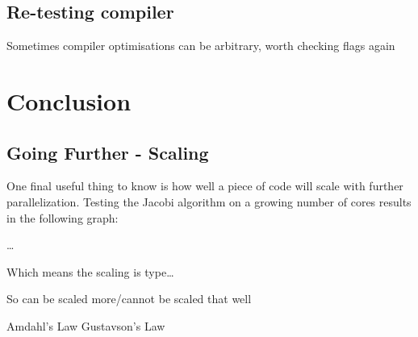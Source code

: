 \documentclass{article}
\begin{document}
\subsection{Re-testing compiler}
Sometimes compiler optimisations can be arbitrary, worth checking flags again

\section{Conclusion}
\subsection{Going Further - Scaling}
One final useful thing to know is how well a piece of code will scale
with further parallelization. Testing the Jacobi algorithm on a growing number of
cores results in the following graph:

\ldots

Which means the scaling is type\ldots

So can be scaled more/cannot be scaled that well

Amdahl's Law Gustavson's Law
\end{document}

